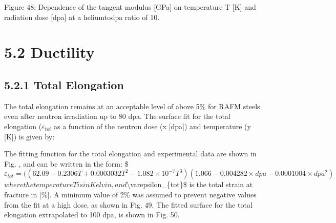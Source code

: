 \documentclass[letterpaper,10pt,english]{jupyterBook}
\begin{document}
	\sphinxAtStartPar
	Figure 48: Dependence of the tangent modulus {[}GPa{]} on temperature T {[}K{]} and radiation dose {[}dpa{]} at a helium\sphinxhyphen{}to\sphinxhyphen{}dpa ratio of 10.
	
	
	\section{5.2 Ductility}
	\label{\detokenize{5 Radiation Effects on Mechanical Properties:ductility}}
	
	\subsection{5.2.1 Total Elongation}
	\label{\detokenize{5 Radiation Effects on Mechanical Properties:total-elongation}}
	\sphinxAtStartPar
	The total elongation remains at an acceptable level of above 5\% for RAFM steels even after neutron irradiation up to 80 dpa. The surface fit for the total elongation (\(\varepsilon_{tot}\) as a function of the neutron dose (x {[}dpa{]}) and temperature (y {[}K{]})  is given by:
	
	\sphinxAtStartPar
	
	\sphinxAtStartPar
	The fitting function for the total elongation and experimental data are shown in Fig. , and can be written in the form:
	\$\( \varepsilon_{tot}=((62.09-0.2306T+0.0003032 T^2-1.082\times 10^{-7}  T^3)( 1.066-0.004282\times dpa -0.0001004\times dpa^2) \)\(
	where the temperature T is in Kelvin, and \)\textbackslash{}varepsilon\_\{tot\}\$ is the total strain at fracture in {[}\%{]}. A minimum value of 2\% was assumed to prevent negative values from the fit at a high dose, as shown in Fig. 49. The fitted surface for the total elongation extrapolated to 100 dpa, is shown in Fig. 50.
	
	
\end{document}
